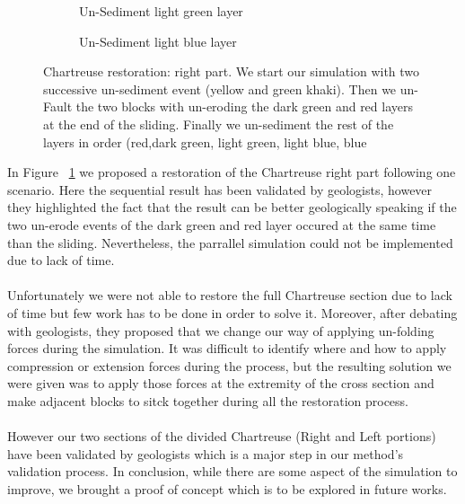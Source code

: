 \documentclass[12pt, a4paper]{report} %
\begin{document}
\begin{center}
\begin{figure}[H]
\begin{subfigure}[b]{.45\linewidth}
	\caption{Un-Sediment light green layer}
	\end{subfigure}
	\begin{subfigure}[b]{.45\linewidth}
	\centering
	\caption{Un-Sediment light blue layer}
	\end{subfigure}
	
\caption{Chartreuse restoration: right part. We start our simulation with two successive un-sediment event (yellow and green khaki). Then we un-Fault the two blocks with un-eroding the dark green and red layers at the end of the sliding. Finally we un-sediment the rest of the layers in order (red,dark green, light green, light blue, blue}
\label{chartreusedrest}
\end{figure}
\end{center}	
In Figure ~\ref{chartreusedrest} we proposed a restoration of the Chartreuse right part following one scenario. Here the sequential result has been validated by geologists, however they highlighted the fact that the result can be better geologically speaking if the two un-erode events of the dark green and red layer occured at the same time than the sliding. Nevertheless, the parrallel simulation could not be implemented due to lack of time.\\\\
 Unfortunately we were not able to restore the full Chartreuse section due to lack of time but few work has to be done in order to solve it. Moreover, after debating with geologists, they proposed that we change our way of applying un-folding forces during the simulation. It was difficult to identify where and how to apply compression or extension forces during the process, but the resulting solution we were given was to apply those forces at the extremity of the cross section and make adjacent blocks to sitck together during all the restoration process.\\\\
 However our two sections of the divided Chartreuse (Right and Left portions) have been validated by geologists which is a major step in our method's validation process. In conclusion, while there are some aspect of the simulation  to  improve, we brought a proof of concept which is to be explored in future works.
\end{document}
